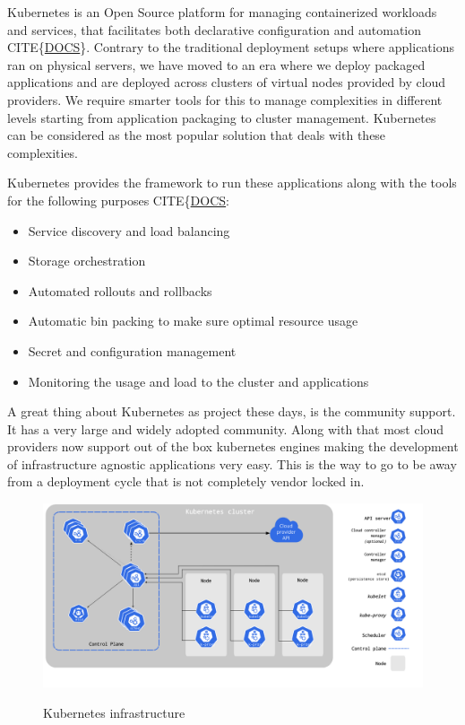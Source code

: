 \documentclass[12pt,titlepage]{article}
\begin{document}
Kubernetes is an Open Source platform for managing containerized workloads and
services, that facilitates both declarative configuration and automation CITE\{\href{https://kubernetes.io/docs/concepts/overview/what-is-kubernetes/}{DOCS}\}.  
Contrary to the traditional deployment setups where applications ran on physical
servers, we have moved to an era where we deploy packaged applications and are
deployed across clusters of virtual nodes provided by cloud providers. We
require smarter tools for this to manage complexities in different levels
starting from application packaging to cluster management. Kubernetes can be
considered as the most popular solution that deals with these complexities.

Kubernetes provides the framework to run these applications along with the tools
for the following purposes CITE\{\href{https://kubernetes.io/docs/concepts/overview/what-is-kubernetes/}{DOCS}:
\begin{itemize}
\item Service discovery and load balancing
\item Storage orchestration
\item Automated rollouts and rollbacks
\item Automatic bin packing to make sure optimal resource usage
\item Secret and configuration management
\item Monitoring the usage and load to the cluster and applications
\end{itemize}

A great thing about Kubernetes as project these days, is the community support.
It has a very large and widely adopted community. Along with that most cloud
providers now support out of the box kubernetes engines making the development
of infrastructure agnostic applications very easy. This is the way to go to be
away from a deployment cycle that is not completely vendor locked in.

\begin{figure}[!h]
    \caption{Kubernetes infrastructure}
    \centering
    \includegraphics[width=180mm]{./thesis_images/k8s.png}
    \label{fig:k8s}
\end{figure}
\end{document}
